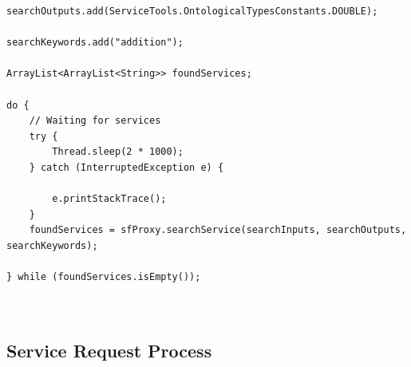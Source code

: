 \begin{itemize}
\begin{lstlisting}
searchOutputs.add(ServiceTools.OntologicalTypesConstants.DOUBLE);

searchKeywords.add("addition");

ArrayList<ArrayList<String>> foundServices;

do {
	// Waiting for services
	try {
		Thread.sleep(2 * 1000);
	} catch (InterruptedException e) {

		e.printStackTrace();
	}
	foundServices = sfProxy.searchService(searchInputs, searchOutputs, searchKeywords);

} while (foundServices.isEmpty());



\end{lstlisting}
\end{itemize}


\subsection{Service Request Process}
\label{sec:serviceRequestProcess}


